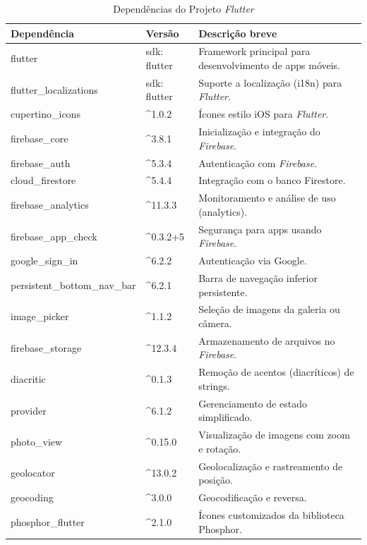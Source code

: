 \begin{table}[H]
    \centering
    \caption{Dependências do Projeto \textit{Flutter}}
    \begin{tabular}{|p{4cm}|p{2.5cm}|p{8cm}|}
    \hline
    \textbf{Dependência} & \textbf{Versão} & \textbf{Descrição breve} \\ \hline
    flutter & sdk: flutter & Framework principal para desenvolvimento de apps móveis. \\ \hline
    flutter\_localizations & sdk: flutter & Suporte a localização (i18n) para \textit{Flutter}. \\ \hline
    cupertino\_icons & \^{}1.0.2 & Ícones estilo iOS para \textit{Flutter}. \\ \hline
    firebase\_core & \^{}3.8.1 & Inicialização e integração do \textit{Firebase}. \\ \hline
    firebase\_auth & \^{}5.3.4 & Autenticação com \textit{Firebase}. \\ \hline
    cloud\_firestore & \^{}5.4.4 & Integração com o banco Firestore. \\ \hline
    firebase\_analytics & \^{}11.3.3 & Monitoramento e análise de uso (analytics). \\ \hline
    firebase\_app\_check & \^{}0.3.2+5 & Segurança para apps usando \textit{Firebase}. \\ \hline
    google\_sign\_in & \^{}6.2.2 & Autenticação via Google. \\ \hline
    persistent\_bottom\_nav\_bar & \^{}6.2.1 & Barra de navegação inferior persistente. \\ \hline
    image\_picker & \^{}1.1.2 & Seleção de imagens da galeria ou câmera. \\ \hline
    firebase\_storage & \^{}12.3.4 & Armazenamento de arquivos no \textit{Firebase}. \\ \hline
    diacritic & \^{}0.1.3 & Remoção de acentos (diacríticos) de strings. \\ \hline
    provider & \^{}6.1.2 & Gerenciamento de estado simplificado. \\ \hline
    photo\_view & \^{}0.15.0 & Visualização de imagens com zoom e rotação. \\ \hline
    geolocator & \^{}13.0.2 & Geolocalização e rastreamento de posição. \\ \hline
    geocoding & \^{}3.0.0 & Geocodificação e reversa. \\ \hline
    phosphor\_flutter & \^{}2.1.0 & Ícones customizados da biblioteca Phosphor. \\ \hline

\end{tabular}
\end{table}
